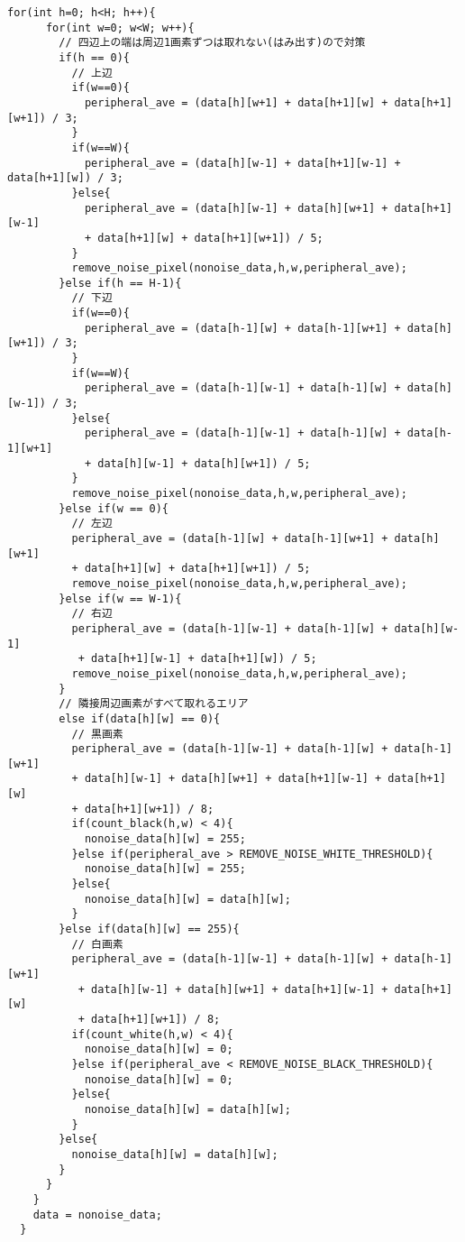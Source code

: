 \begin{lstlisting}[basicstyle=\ttfamily\footnotesize, frame=single]
    for(int h=0; h<H; h++){
      for(int w=0; w<W; w++){
        // 四辺上の端は周辺1画素ずつは取れない(はみ出す)ので対策
        if(h == 0){
          // 上辺
          if(w==0){
            peripheral_ave = (data[h][w+1] + data[h+1][w] + data[h+1][w+1]) / 3;
          }
          if(w==W){
            peripheral_ave = (data[h][w-1] + data[h+1][w-1] + data[h+1][w]) / 3;
          }else{
            peripheral_ave = (data[h][w-1] + data[h][w+1] + data[h+1][w-1] 
            + data[h+1][w] + data[h+1][w+1]) / 5;
          }
          remove_noise_pixel(nonoise_data,h,w,peripheral_ave);
        }else if(h == H-1){
          // 下辺
          if(w==0){
            peripheral_ave = (data[h-1][w] + data[h-1][w+1] + data[h][w+1]) / 3;
          }
          if(w==W){
            peripheral_ave = (data[h-1][w-1] + data[h-1][w] + data[h][w-1]) / 3;
          }else{
            peripheral_ave = (data[h-1][w-1] + data[h-1][w] + data[h-1][w+1] 
            + data[h][w-1] + data[h][w+1]) / 5;
          }
          remove_noise_pixel(nonoise_data,h,w,peripheral_ave);
        }else if(w == 0){
          // 左辺
          peripheral_ave = (data[h-1][w] + data[h-1][w+1] + data[h][w+1] 
          + data[h+1][w] + data[h+1][w+1]) / 5;
          remove_noise_pixel(nonoise_data,h,w,peripheral_ave);
        }else if(w == W-1){
          // 右辺
          peripheral_ave = (data[h-1][w-1] + data[h-1][w] + data[h][w-1]
           + data[h+1][w-1] + data[h+1][w]) / 5;
          remove_noise_pixel(nonoise_data,h,w,peripheral_ave);
        }
        // 隣接周辺画素がすべて取れるエリア
        else if(data[h][w] == 0){
          // 黒画素
          peripheral_ave = (data[h-1][w-1] + data[h-1][w] + data[h-1][w+1] 
          + data[h][w-1] + data[h][w+1] + data[h+1][w-1] + data[h+1][w] 
          + data[h+1][w+1]) / 8;
          if(count_black(h,w) < 4){
            nonoise_data[h][w] = 255;
          }else if(peripheral_ave > REMOVE_NOISE_WHITE_THRESHOLD){
            nonoise_data[h][w] = 255;
          }else{
            nonoise_data[h][w] = data[h][w];
          }
        }else if(data[h][w] == 255){
          // 白画素
          peripheral_ave = (data[h-1][w-1] + data[h-1][w] + data[h-1][w+1]
           + data[h][w-1] + data[h][w+1] + data[h+1][w-1] + data[h+1][w] 
           + data[h+1][w+1]) / 8;
          if(count_white(h,w) < 4){
            nonoise_data[h][w] = 0;
          }else if(peripheral_ave < REMOVE_NOISE_BLACK_THRESHOLD){
            nonoise_data[h][w] = 0;
          }else{
            nonoise_data[h][w] = data[h][w];
          }
        }else{
          nonoise_data[h][w] = data[h][w];
        }
      }
    }
    data = nonoise_data;
  }

  \end{lstlisting}
